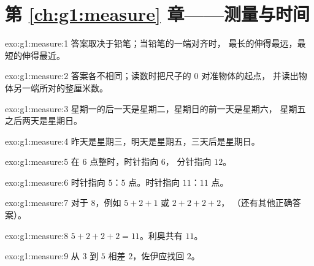 \section*{第 \ref{ch:g1:measure} 章——测量与时间}

\begin{solution}{exo:g1:measure:1}
答案取决于铅笔；当铅笔的一端对齐时，
最长的伸得最远，最短的伸得最近。
\end{solution}

\begin{solution}{exo:g1:measure:2}
答案各不相同；读数时把尺子的 $0$ 对准物体的起点，
并读出物体另一端所对的整厘米数。
\end{solution}

\begin{solution}{exo:g1:measure:3}
星期一的后一天是星期二，星期日的前一天是星期六，
星期五之后两天是星期日。
\end{solution}

\begin{solution}{exo:g1:measure:4}
昨天是星期三，明天是星期五，三天后是星期日。
\end{solution}

\begin{solution}{exo:g1:measure:5}
在 $6$ 点整时，时针指向 $6$，
分针指向 $12$。
\end{solution}

\begin{solution}{exo:g1:measure:6}
时针指向 $5$：$5$ 点。时针指向 $11$：$11$ 点。
\end{solution}

\begin{solution}{exo:g1:measure:7}
对于 $8$，例如 $5 + 2 + 1$ 或 $2 + 2 + 2 + 2$，
（还有其他正确答案）。
\end{solution}

\begin{solution}{exo:g1:measure:8}
$5 + 2 + 2 + 2 = 11$。利奥共有 $11$。
\end{solution}

\begin{solution}{exo:g1:measure:9}
从 $3$ 到 $5$ 相差 $2$，佐伊应找回 $2$。
\end{solution}

